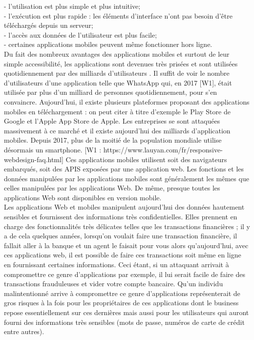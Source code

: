 - l'utilisation est plus simple et plus intuitive; \\
- l’exécution est plus rapide : les éléments d’interface n’ont pas besoin d’être téléchargés depuis un serveur; \\
- l’accès aux données de l’utilisateur est plus facile; \\
- certaines applications mobiles peuvent même fonctionner hors ligne.\\
Du fait des nombreux avantages des applications mobiles et surtout de leur simple accessibilité, les applications sont devenues très prisées et sont utilisées quotidiennement par des milliards d'utilisateurs	. Il suffit de voir le nombre d'utilisateurs d'une application telle que WhatsApp qui, en 2017 [W1], était utilisée par plus d'un milliard de personnes quotidiennement, pour s'en convaincre. Aujourd'hui, il existe plusieurs plateformes proposant des applications mobiles en téléchargement : on peut citer à titre d'exemple le Play Store de Google et l'Apple App Store de Apple. Les entreprises se sont attaquées massivement à ce marché et il existe aujourd'hui des milliards d'application mobiles. Depuis 2017, plus de la moitié de la population mondiale utilise désormais un smartphone. [W1 : https://www.lauyan.com/fr/responsive-webdesign-faq.html]
Ces applications mobiles utilisent soit des navigateurs embarqués, soit des APIS exposées par une application web. Les fonctions et les données manipulées par les applications mobiles sont généralement les mêmes que celles manipulées par les applications Web. De même, presque toutes les applications Web sont disponibles en version mobile.\\
Les applications Web et mobiles manipulent aujourd'hui des données hautement sensibles et fournissent des informations très confidentielles. Elles prennent en charge des fonctionnalités très délicates telles que les transactions financières ; il y a de cela quelques années, lorsqu’on voulait faire une transaction financière, il fallait aller à la banque et un agent le faisait pour vous alors qu’aujourd’hui, avec ces applications web, il est possible de faire ces transactions soit même en ligne en fournissant certaines informations. Ceci étant, si un attaquant arrivait à compromettre ce genre d’applications par exemple, il lui serait facile de faire des transactions frauduleuses et vider votre compte bancaire. Qu’un individu malintentionné arrive à compromettre ce genre d’applications représenterait de gros risques à la fois pour les propriétaires de ces applications dont le business repose essentiellement sur ces dernières mais aussi pour les utilisateurs qui auront fourni des informations très sensibles (mots de passe, numéros de carte de crédit entre autres). \\


